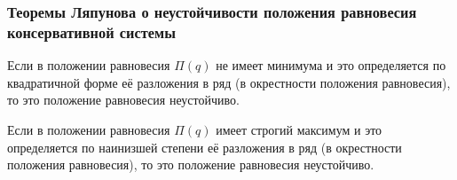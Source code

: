 \subsubsection*{Теоремы Ляпунова о неустойчивости положения равновесия консервативной системы}


\begin{to_thr}
    Если в положении равновесия $\Pi(q)$ не имеет минимума и это определяется по квадратичной форме её разложения в ряд (в окрестности положения равновесия), то это положение равновесия неустойчиво.     
\end{to_thr}


\begin{to_thr}
    Если в положении равновесия $\Pi(q)$  имеет строгий максимум и это определяется по наинизшей степени её разложения в ряд (в окрестности положения равновесия), то это положение равновесия неустойчиво.     
\end{to_thr}





